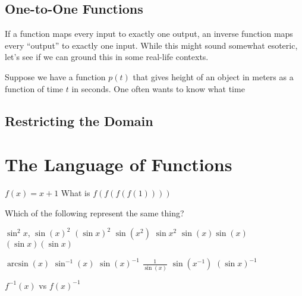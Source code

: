 \subsection{One-to-One Functions}


If a function maps every input to exactly one output, an inverse
function maps every ``output'' to exactly one input. While this might
sound somewhat esoteric, let's see if we can ground this in some
real-life contexts.

\begin{example}

\end{example}

Suppose we have a function $p(t)$ that gives height of an object in
meters as a function of time $t$ in seconds.  One often wants to know
what time 


\subsection{Restricting the Domain}






\section{The Language of Functions}



$f(x) = x+1$ What is $f(f(f(f(1))))$



Which of the following represent the same thing?

$\sin^2 x$, $\sin(x)^2$  $(\sin x)^2$ $\sin(x^2)$ $\sin x^2$ $\sin(x) \sin(x)$ $(\sin x)(\sin x)$


$\arcsin(x)$ $\sin^{-1}(x)$ $\sin(x)^{-1}$ $\frac{1}{\sin(x)}$ $\sin(x^{-1})$  $(\sin x)^{-1}$


$f^{-1}(x)$ vs $f(x)^{-1}$
